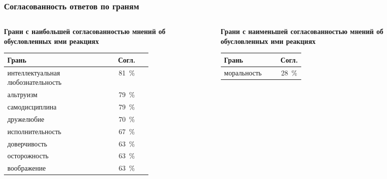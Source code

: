 \documentclass{beamer}
\begin{document}
\begin{frame}
    \frametitle{Согласованность ответов по граням}
    \scriptsize
    \begin{columns}[T,onlytextwidth]
        \begin{column}{0.49\textwidth}
            \textbf{Грани с наибольшей согласованностью мнений об обусловленных ими реакциях}
            \vspace{0.08cm}
            \begin{center}
                \renewcommand{\arraystretch}{1.2}
                \begin{tabular}{|p{0.70\linewidth}|c|}
                    \hline
                    \textbf{Грань} & \textbf{Согл.} \\
                    \hline
                    интеллектуальная любознательность & 81~\% \\
                    \hline
                    альтруизм & 79~\% \\
                    \hline
                    самодисциплина & 79~\% \\
                    \hline
                    дружелюбие & 70~\% \\
                    \hline
                    исполнительность & 67~\% \\
                    \hline
                    доверчивость & 63~\% \\
                    \hline
                    осторожность & 63~\% \\
                    \hline
                    воображение & 63~\% \\
                    \hline
                \end{tabular}
            \end{center}
        \end{column}
        \begin{column}{0.49\textwidth}
            \textbf{Грани с наименьшей согласованностью мнений об обусловленных ими реакциях}
            \vspace{0.08cm}
            \begin{center}
                \renewcommand{\arraystretch}{1.2}
                \begin{tabular}{|p{0.70\linewidth}|c|}
                    \hline
                    \textbf{Грань} & \textbf{Согл.} \\
                    \hline
                    моральность & 28~\% \\
                    \hline

\end{tabular}
\end{center}
\end{column}
\end{columns}
\end{frame}
\end{document}
